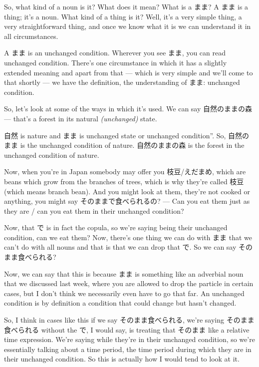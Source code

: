So, what kind of a noun is it? What does it mean? What is a まま? A まま is a thing; it's a noun. What kind of a thing is it? Well, it's a very simple thing, a very straightforward thing, and once we know what it is we can understand it in all circumstances.

A まま is an unchanged condition. Wherever you see まま, you can read unchanged condition. There's one circumstance in which it has a slightly extended meaning and apart from that --- which is very simple and we'll come to that shortly --- we have the definition, the understanding of まま: unchanged condition.

So, let's look at some of the ways in which it's used. We can say 自然のままの森 --- that's a forest in its natural {\em (unchanged)} state.

{}

自然 is nature and まま is unchanged state or unchanged condition”. So, 自然のまま is the unchanged condition of nature. 自然のままの森 is the forest in the unchanged condition of nature.

Now, when you're in Japan somebody may offer you 枝豆/えだまめ, which are beans which grow from the branches of trees, which is why they're called 枝豆 (which means branch bean). And you might look at them, they're not cooked or anything, you might say そのままで食べられるの? --- Can you eat them just as they are / can you eat them in their unchanged condition?

{}

Now, that で is in fact the copula, so we're saying being their unchanged condition, can we eat them? Now, there's one thing we can do with まま that we can't do with all nouns and that is that we can drop that で. So we can say そのまま食べられる?

Now, we can say that this is because まま is something like an adverbial noun that we discussed last week, where you are allowed to drop the particle in certain cases, but I don't think we necessarily even have to go that far. An unchanged condition is by definition a condition that could change but hasn't changed.

So, I think in cases like this if we say そのまま食べられる, we're saying そのまま食べられる without the で, I would say, is treating that そのまま like a relative time expression. We're saying while they're in their unchanged condition, so we're essentially talking about a time period, the time period during which they are in their unchanged condition. So this is actually how I would tend to look at it.

